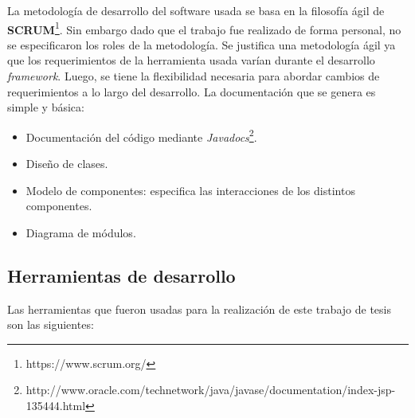 La metodología de desarrollo del software usada se basa en la filosofía ágil de \textbf{SCRUM}\footnote{https://www.scrum.org/}. Sin embargo dado que el trabajo fue realizado de forma personal, no se especificaron los roles de la metodología. Se justifica una metodología ágil ya que los requerimientos de la herramienta usada varían durante el desarrollo \textit{framework}. Luego, se tiene la flexibilidad necesaria para abordar cambios de requerimientos a lo largo del desarrollo. La documentación que se genera es simple y básica:
\begin{itemize}
	\item Documentación del código mediante \textit{Javadocs}\footnote{http://www.oracle.com/technetwork/java/javase/documentation/index-jsp-135444.html}.
	\item Diseño de clases.
	\item Modelo de componentes: especifica las interacciones de los distintos componentes.
	\item Diagrama de módulos.
\end{itemize}

\subsection{Herramientas de desarrollo}

Las herramientas que fueron usadas para la realización de este trabajo de tesis son las siguientes:

